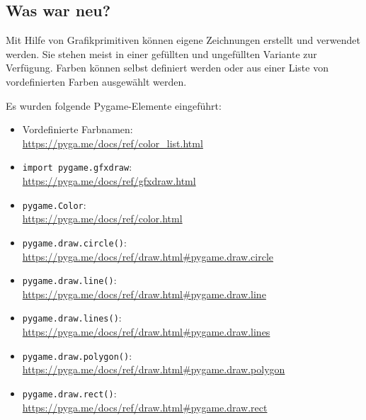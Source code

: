 

\subsection*{Was war neu?}

Mit Hilfe von Grafikprimitiven können eigene Zeichnungen erstellt und verwendet werden. Sie stehen meist in einer gefüllten und ungefüllten Variante zur Verfügung. Farben können selbst definiert werden oder aus einer Liste von vordefinierten Farben ausgewählt werden. 

Es wurden folgende Pygame-Elemente eingeführt:

\begin{itemize}
	\item Vordefinierte Farbnamen:\\ 
	\url{https://pyga.me/docs/ref/color_list.html}
	
	\item \texttt{import pygame.gfxdraw}:\\ \url{https://pyga.me/docs/ref/gfxdraw.html}
	
	\item \texttt{pygame.Color}:
	\\
	\url{https://pyga.me/docs/ref/color.html}
	
	\item \texttt{pygame.draw.circle()}:
	\\
	\url{https://pyga.me/docs/ref/draw.html#pygame.draw.circle}
	
	\item \texttt{pygame.draw.line()}:
	\\
	\url{https://pyga.me/docs/ref/draw.html#pygame.draw.line}
	
	\item \texttt{pygame.draw.lines()}:
	\\
	\url{https://pyga.me/docs/ref/draw.html#pygame.draw.lines}
	
	\item \texttt{pygame.draw.polygon()}:
	\\
	\url{https://pyga.me/docs/ref/draw.html#pygame.draw.polygon}
	
	\item \texttt{pygame.draw.rect()}:
	\\
	\url{https://pyga.me/docs/ref/draw.html#pygame.draw.rect}
	

\end{itemize}
